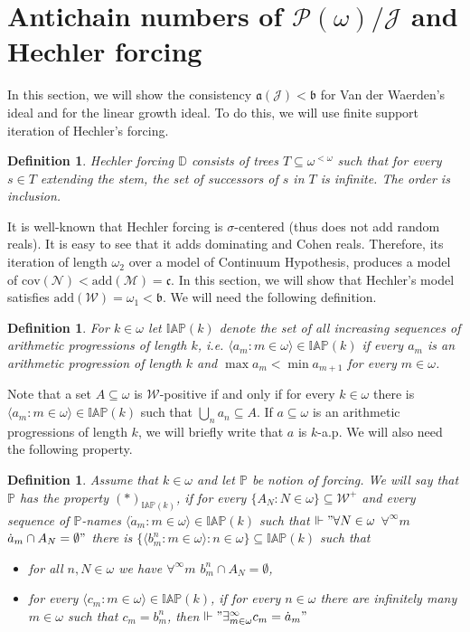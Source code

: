 \documentclass[a4paper]{amsart}
\newtheorem{definition}[theorem]{Definition}
\newcommand{\aaa}{\mathfrak{a}}
\newcommand{\bbb}{\mathfrak{b}}
\newcommand{\continuum}{\mathfrak{c}}
\newcommand{\Meager}{\mathcal{M}}
\newcommand{\Null}{\mathcal{N}}
\newcommand{\baire}{\omega^{<\omega}}
\newcommand{\add}{\mathrm{add}}
\newcommand{\cov}{\mathrm{cov}}
\newcommand{\J}{\mathcal{J}}
\newcommand{\WANDER}{\mathcal{W}}
\newcommand{\IAP}{\mathbb{IAP}}
\begin{document}
\section{Antichain numbers of $\mathcal{P}(\omega)/\J$ and Hechler forcing}
In this section, we will show the consistency $\aaa(\J)<\bbb$ for Van der Waerden's ideal and for the linear growth ideal. To do this, we will use finite support iteration of Hechler's forcing.
\begin{definition}
    Hechler forcing $\mathbb{D}$ consists of trees $T\subseteq\baire$ such that for every $s\in T$ extending the stem, the set of successors of $s$ in $T$ is infinite. The order is inclusion.
\end{definition}
It is well-known that Hechler forcing is $\sigma$-centered (thus does not add random reals). It is easy to see that it adds dominating and Cohen reals. Therefore, its iteration of length $\omega_{2}$ over a model of Continuum Hypothesis, produces a model of $\cov(\Null)<\add(\Meager)=\continuum$. In this section, we will show that Hechler's model satisfies $\add(\WANDER)=\omega_{1}<\bbb$. We will need the following definition.
\begin{definition}
    For $k\in\omega$ let $\IAP(k)$ denote the set of all increasing sequences of arithmetic progressions of length $k$, i.e. $\langle a_{m}:m\in\omega\rangle\in \IAP(k)$ if every $a_{m}$ is an arithmetic progression of length $k$ and $\max a_{m}<\min a_{m+1}$ for every $m\in\omega$.
\end{definition}
Note that a set $A\subseteq\omega$ is $\WANDER$-positive if and only if for every $k\in\omega$ there is $\langle a_{m}:m\in\omega\rangle\in \IAP(k)$ such that $\bigcup_{n}a_{n}\subseteq A$. If $a\subseteq\omega$ is an arithmetic progressions of length $k$, we will briefly write that $a$ is $k$-a.p. We will also need the following property.
\begin{definition}\label{kanpproperty}
    Assume that $k\in\omega$ and let $\mathbb{P}$ be notion of forcing. We will say that $\mathbb{P}$ has the property $(*)_{\IAP(k)}$, if for every $\{A_{N}:N\in\omega\}\subseteq\WANDER^{+}$ and every sequence of $\mathbb{P}$-names $ \langle\dot{a}_{m}:m\in\omega\rangle\in \IAP(k)$ such that $\Vdash"\forall N\in\omega$ $\forall^{\infty}m$ $\dot{a}_{m}\cap A_{N}=\emptyset"$ there is $\{\langle b^{n}_{m}:m\in\omega\rangle:n\in\omega\}\subseteq\IAP(k)$ such that
    \begin{itemize}
        \item[1)] for all $n,N\in\omega$ we have $\forall^{\infty}m$ $b^{n}_{m}\cap A_{N}=\emptyset$, 
        \item[2)] for every $\langle c_{m}:m\in\omega\rangle\in\IAP(k)$, if for every $n\in\omega$ there are infinitely many $m\in\omega$ such that $c_{m}=b^{n}_{m}$, then $\Vdash"\exists^{\infty}_{m\in\omega} c_{m}=\dot{a}_{m}"$ 
    \end{itemize}
\end{definition}
\end{document}
